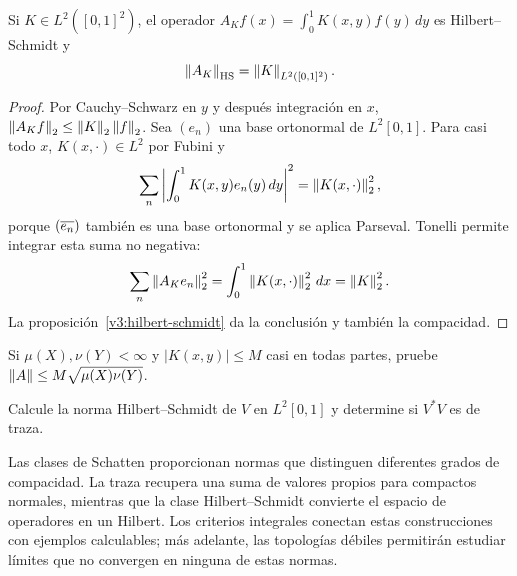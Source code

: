 \begin{proposicion}\label{v3:nucleo-hs}
Si $K\in L^2([0,1]^2)$, el operador $A_Kf(x)=\int_0^1K(x,y)f(y)\,dy$ es Hilbert--Schmidt y
\[\left\lVert A_K\right\rVert_{\mathrm{HS}}=\left\lVert K\right\rVert_{L^2([0,1]^2)}.
\]
\end{proposicion}
\begin{proof}
Por Cauchy--Schwarz en $y$ y después integración en $x$, $\left\lVert A_Kf\right\rVert_2\le\left\lVert K\right\rVert_2\left\lVert f\right\rVert_2$. Sea $(e_n)$ una base ortonormal de $L^2[0,1]$. Para casi todo $x$, $K(x,\cdot)\in L^2$ por Fubini y
\[\sum_n\left|\int_0^1K(x,y)e_n(y)\,dy\right|^2
=\left\lVert K(x,\cdot)\right\rVert_2^2,
\]
porque $(\overline{e_n})$ también es una base ortonormal y se aplica Parseval. Tonelli permite integrar esta suma no negativa:
\[\sum_n\left\lVert A_Ke_n\right\rVert_2^2=\int_0^1\left\lVert K(x,\cdot)\right\rVert_2^2\,dx=\left\lVert K\right\rVert_2^2.
\]
La proposición~\ref{v3:hilbert-schmidt} da la conclusión y también la compacidad.
\end{proof}

\begin{ejercicio}\label{ej:v3-ampl-schur}
Si $\mu(X),\nu(Y)<\infty$ y $|K(x,y)|\le M$ casi en todas partes, pruebe $\left\lVert A\right\rVert\le M\sqrt{\mu(X)\nu(Y)}$.
\end{ejercicio}


\begin{ejercicio}\label{ej:v3-ampl-volterra-hs}
Calcule la norma Hilbert--Schmidt de $V$ en $L^2[0,1]$ y determine si $V^*V$ es de traza.
\end{ejercicio}


Las clases de Schatten proporcionan normas que distinguen diferentes grados de compacidad. La traza recupera una suma de valores propios para compactos normales, mientras que la clase Hilbert--Schmidt convierte el espacio de operadores en un Hilbert. Los criterios integrales conectan estas construcciones con ejemplos calculables; más adelante, las topologías débiles permitirán estudiar límites que no convergen en ninguna de estas normas.
